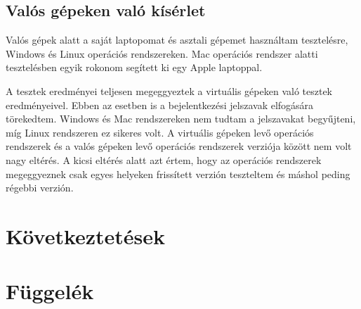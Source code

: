 \documentclass[12pt,a4paper,oneside]{report}
\begin{document}
\section{Valós gépeken való kísérlet}
Valós gépek alatt a saját laptopomat és asztali gépemet használtam tesztelésre, Windows és Linux operációs rendszereken. Mac operációs rendszer alatti tesztelésben egyik rokonom segített ki egy Apple laptoppal.

A tesztek eredményei teljesen megeggyeztek a virtuális gépeken való tesztek eredményeivel. Ebben az esetben is a bejelentkezési jelszavak elfogására törekedtem. Windows és Mac rendszereken nem tudtam a jelszavakat begyűjteni, míg Linux rendszeren ez sikeres volt. A virtuális gépeken levő operációs rendszerek és a valós gépeken levő operációs rendszerek verziója között nem volt nagy eltérés. A kicsi eltérés alatt azt értem, hogy az operációs rendszerek megeggyeznek csak egyes helyeken frissített verzión teszteltem és máshol peding régebbi verzión.

\chapter{Következtetések}\label{sec:conc}

\renewcommand{\listfigurename}{Ábrák jegyzéke}
\listoffigures
\thispagestyle{empty}

\renewcommand{\listtablename}{Táblázatok jegyzéke}
\listoftables
\thispagestyle{empty}

\printbibliography

\chapter{Függelék}\label{sec:dep}
\end{document}
